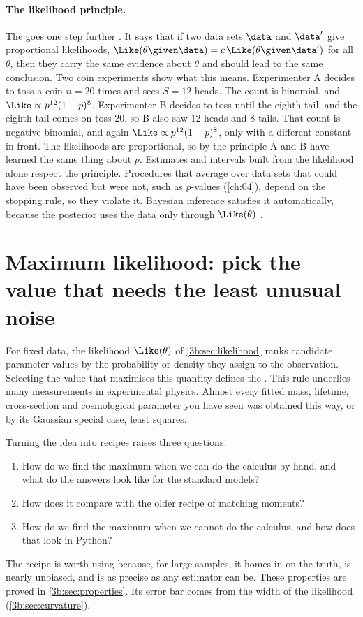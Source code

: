 \paragraph{The likelihood principle.}
The  goes one step further
. It says that if two data sets $\data$ and
$\data'$ give proportional likelihoods, $\Like(\theta\given\data)=
c\,\Like(\theta\given\data')$ for all $\theta$, then they carry the same
evidence about $\theta$ and should lead to the same conclusion. Two coin
experiments show what this means. Experimenter A decides to toss a coin
$n=20$ times and sees $S=12$ heads. The count is binomial, and
$\Like\propto p^{12}(1-p)^8$. Experimenter B decides to toss until the
eighth tail, and the eighth tail comes on toss $20$, so B also saw $12$
heads and $8$ tails. That count is negative binomial, and again
$\Like\propto p^{12}(1-p)^8$, only with a different constant in front. The
likelihoods are proportional, so by the principle A and B have learned the
same thing about $p$. Estimates and intervals built from the likelihood
alone respect the principle. Procedures that average over data sets that could have been
observed but were not, such as $p$-values (\cref{ch:04}), depend on the
stopping rule, so they violate it. Bayesian inference satisfies it
automatically, because the posterior uses the data only through
$\Like(\theta)$ .
\section{Maximum likelihood: pick the value that needs the least unusual noise}
\label{3b:sec:mle}

For fixed data, the likelihood $\Like(\theta)$ of \cref{3b:sec:likelihood}
ranks candidate parameter values by the probability or density they assign to
the observation. Selecting the value that maximises this quantity defines the
. This rule underlies many measurements
in experimental physics. Almost every fitted mass, lifetime, cross-section and
cosmological parameter you have seen was obtained this way, or by its
Gaussian special case, least squares.

Turning the idea into recipes raises three questions.
\begin{enumerate}[label=\arabic*.]
  \item How do we find the maximum when we can do the calculus by hand, and
        what do the answers look like for the standard models?
  \item How does it compare with the older recipe of matching moments?
  \item How do we find the maximum when we cannot do the calculus, and how
        does that look in Python?
\end{enumerate}
The recipe is worth using because, for large samples, it homes in on the
truth, is nearly unbiased, and is as precise as any estimator can be. These
properties are proved in \cref{3b:sec:properties}. Its error bar comes from
the width of the likelihood (\cref{3b:sec:curvature}).

